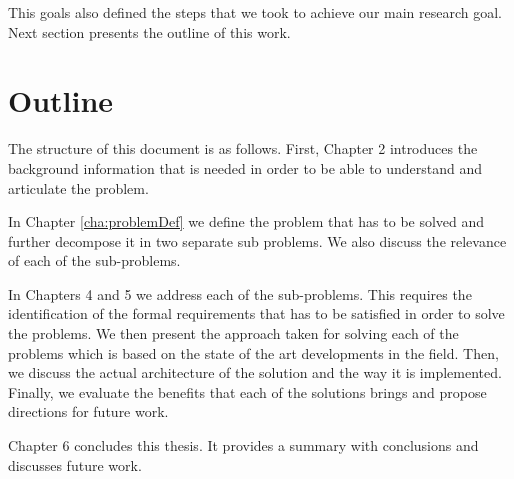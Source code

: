 This goals also defined the steps that we took to achieve our main research goal. Next section presents the outline of this work.


\section{Outline}
The structure of this document is as follows. First, Chapter 2 introduces the background information that is needed in order to be able to understand and articulate the problem.

In Chapter \ref{cha:problemDef} we define the problem that has to be solved and further decompose it in two separate sub problems. We also discuss the relevance of each of the sub-problems.

In Chapters 4 and 5 we address each of the sub-problems. This requires the identification of the formal requirements that has to be satisfied in order to solve the problems. We then present the approach taken for solving each of the problems which is based on the state of the art developments in the field. Then, we discuss the actual architecture of the solution and the way it is implemented. Finally, we evaluate the benefits that each of the solutions brings and propose directions for future work. 

Chapter 6 concludes this thesis. It provides a summary with conclusions and discusses future work.
